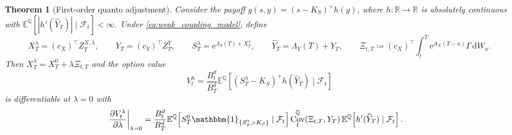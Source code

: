 \documentclass[10pt,a4paper,reqno]{amsart}
\newtheorem{theorem}{Theorem}[section]
\newcommand{\R}{\mathbb{R}}
\newcommand{\E}{\mathbb{E}}
\newcommand{\Q}{\mathbb{Q}}
\newcommand{\F}{\mathcal{F}}
\newcommand{\1}{\mathbbm{1}}
\newcommand{\dd}{\mathrm{d}}
\newcommand{\ee}{\mathrm{e}}
\DeclareMathOperator{\Cov}{Cov}
\begin{document}
\begin{theorem}[First-order quanto adjustment]
\label{thm:weak_coupling}
Consider the payoff $g(s,y)=(s-K_S)^+h(y)$, where
$h:\R\to\R$ is absolutely continuous with
$\E^\Q[|h'(\widehat{Y}_T)| \mid \F_t] < \infty$. Under
\eqref{eq:weak_coupling_model}, define
$$
X_T^\lambda = (c_X)^\top Z_T^{X,\lambda},\qquad
Y_T = (c_Y)^\top Z_T^Y,\qquad
S_T^\lambda = \ee^{\Lambda_S(T)+X_T^\lambda},
\qquad
\widehat{Y}_T = \Lambda_Y(T)+Y_T,
\qquad
\Xi_{t,T} \coloneqq (c_X)^\top \int_t^T \ee^{A_X(T-u)} \Gamma\,\dd W_u.
$$
Then $X_T^\lambda = X_T^0 + \lambda \Xi_{t,T}$ and the option value
$$
V_t^\lambda
= \frac{B_t^d}{B_T^d}\E^\Q\!\left[(S_T^\lambda-K_S)^+h(\widehat{Y}_T)\mid\F_t\right]
$$
is differentiable at $\lambda=0$ with
\begin{align}
  \left.\frac{\partial V_t^\lambda}{\partial \lambda}\right|_{\lambda=0}
  &= \frac{B_t^d}{B_T^d}
     \E^\Q\!\left[S_T^0 \1_{\{S_T^0>K_S\}}\mid\F_t\right]
     \Cov_t^\Q(\Xi_{t,T},Y_T)\,
     \E^\Q\!\left[h'(\widehat{Y}_T)\mid\F_t\right].
     \label{eq:weak_coupling_price_adjustment}
\end{align}
\end{theorem}
\end{document}

